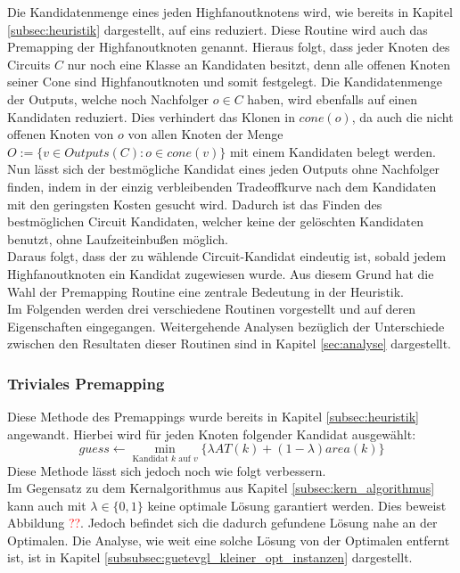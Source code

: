 \documentclass[11pt, a4paper, german]{article}
\begin{document}
 Die Kandidatenmenge eines jeden Highfanoutknotens wird, wie bereits in Kapitel \ref{subsec:heuristik} dargestellt, auf eins reduziert. Diese Routine wird auch das Premapping der Highfanoutknoten genannt. Hieraus folgt, dass jeder Knoten des Circuits $C$ nur noch eine Klasse an Kandidaten besitzt, denn alle offenen Knoten seiner Cone sind Highfanoutknoten und somit festgelegt.  Die Kandidatenmenge der Outputs, welche noch Nachfolger $o \in C$ haben, wird ebenfalls auf einen Kandidaten reduziert. Dies verhindert das Klonen in $cone(o)$, da  auch die nicht offenen Knoten von $o$ von allen Knoten der Menge $O := \{ v \in Outputs(C): o \in cone(v) \}$ mit einem Kandidaten belegt werden.\\
Nun lässt sich der bestmögliche Kandidat eines jeden Outputs ohne Nachfolger finden, indem in der einzig verbleibenden Tradeoffkurve nach dem Kandidaten mit den geringsten Kosten gesucht wird. Dadurch ist das Finden des  bestmöglichen Circuit Kandidaten,  welcher keine der gelöschten Kandidaten benutzt, ohne Laufzeiteinbußen möglich. \\
Daraus folgt, dass der zu wählende Circuit-Kandidat eindeutig ist, sobald jedem Highfanoutknoten ein Kandidat zugewiesen wurde. Aus diesem Grund hat die Wahl der Premapping Routine eine zentrale Bedeutung in der Heuristik.\\

Im Folgenden werden drei verschiedene Routinen vorgestellt und auf deren Eigenschaften eingegangen. Weitergehende Analysen bezüglich der Unterschiede zwischen den Resultaten dieser Routinen sind in Kapitel \ref{sec:analyse} dargestellt.

\subsubsection{Triviales Premapping}
\label{subsec:triviales_premapping}
Diese Methode des Premappings wurde bereits in Kapitel \ref{subsec:heuristik} angewandt. Hierbei wird für jeden Knoten folgender Kandidat ausgewählt: \[ guess \gets \min\limits_{\text{Kandidat }k\text{ auf }v}\{ \lambda AT(k) + (1-\lambda) area(k)  \} \]
Diese Methode lässt sich jedoch noch wie folgt verbessern.\\

Im Gegensatz zu dem Kernalgorithmus aus Kapitel \ref{subsec:kern_algorithmus} kann auch mit $\lambda \in \{ 0 , 1\}$ keine optimale Lösung garantiert werden. Dies beweist Abbildung \textcolor{red}{??}. Jedoch befindet sich die dadurch gefundene Lösung nahe an der Optimalen. Die Analyse, wie weit eine solche Lösung von der Optimalen entfernt ist, ist in Kapitel \ref{subsubsec:guetevgl_kleiner_opt_instanzen} dargestellt.
 
\end{document}
